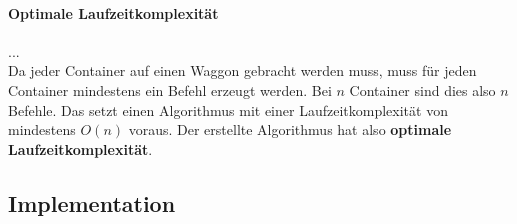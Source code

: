 \paragraph{Optimale Laufzeitkomplexität}
... \\
Da jeder Container auf einen Waggon gebracht werden muss, muss für jeden Container mindestens ein Befehl erzeugt werden.
Bei $n$ Container sind dies also $n$ Befehle. Das setzt einen Algorithmus mit einer Laufzeitkomplexität von mindestens $O(n)$ voraus.
Der erstellte Algorithmus hat also \textbf{optimale Laufzeitkomplexität}.

\subsection{Implementation}
